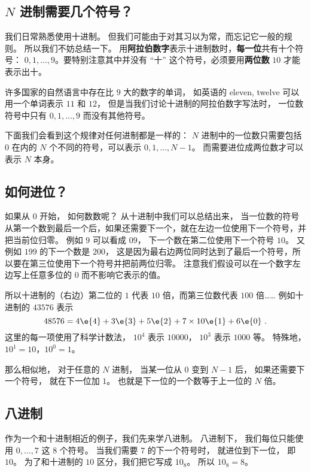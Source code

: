 
\begin{issues}
\issueDraft
\end{issues}

\subsection{$N$ 进制需要几个符号？}
我们日常熟悉使用十进制。 但我们可能由于对其习以为常，而忘记它一般的规则。 所以我们不妨总结一下。 用\textbf{阿拉伯数字}表示十进制数时，\textbf{每一位}共有十个符号： $0,1,\dots, 9$。要特别注意其中并没有 “十” 这个符号，必须要用\textbf{两位数} $10$ 才能表示出十。

许多国家的自然语言中存在比 $9$ 大的数字的单词， 如英语的 eleven, twelve 可以用一个单词表示 $11$ 和 $12$， 但是当我们讨论十进制的阿拉伯数字写法时， 一位数符号中只有 $0,1,\dots, 9$ 而没有其他符号。 

下面我们会看到这个规律对任何进制都是一样的： $N$ 进制中的一位数只需要包括 $0$ 在内的 $N$ 个不同的符号，可以表示 $0,1,\dots,N-1$。 而需要进位成两位数才可以表示 $N$ 本身。

\subsection{如何进位？}
如果从 $0$ 开始， 如何数数呢？ 从十进制中我们可以总结出来， 当一位数的符号从第一个数到最后一个后，如果还需要下一个，就在左边一位使用下一个符号，并把当前位归零。 例如 $9$ 可以看成 $09$， 下一个数在第二位使用下一个符号 $10$。 又例如 $199$ 的下一个数是 $200$， 这是因为最右边两位同时达到了最后一个符号，所以要在第三位使用下一个符号并把前两位归零。 注意我们假设可以在一个数字左边写上任意多位的 $0$ 而不影响它表示的值。

所以十进制的（右边）第二位的 $1$ 代表 $10$ 倍，而第三位数代表 $100$ 倍…… 例如十进制的 $43576$ 表示
\begin{equation}\label{eq_Binary_1}
48576 = 4\e{4} + 3\e{3} + 5\e{2} + 7\times 10\e{1} + 6\e{0}~.
\end{equation}
这里的每一项使用了科学计数法，%
$10^4$ 表示 $10000$， $10^3$ 表示 $1000$ 等。 特殊地， $10^1=10$，$10^0=1$。

那么相似地， 对于任意的 $N$ 进制， 当某一位从 $0$ 变到 $N-1$ 后， 如果还需要下一个符号， 就在下一位加 $1$。 也就是下一位的一个数等于上一位的 $N$ 倍。

\subsection{八进制}
作为一个和十进制相近的例子，我们先来学八进制。 八进制下， 我们每位只能使用 $0,\dots,7$ 这 $8$ 个符号。 当我们需要 $7$ 的下一个符号时， 就进位到下一位， 即 $10$。 为了和十进制的 $10$ 区分，我们把它写成 $10_\text{8}$。 所以 $10_\text{8} = 8$。

